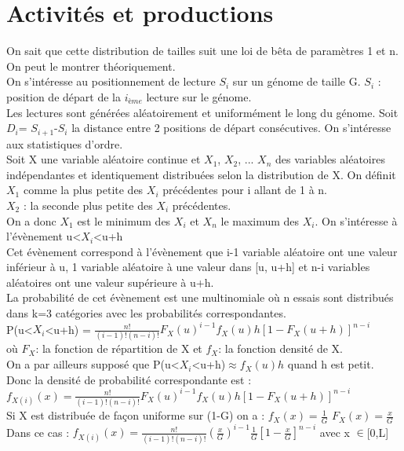 \documentclass[12pt,a4paper]{article} %
\begin{document}
\section{Activités et productions} 
On sait que cette distribution de tailles suit une loi de bêta de paramètres 1 et n.
On peut le montrer théoriquement. \\
On s'intéresse au positionnement de lecture $S_{i}$ sur un génome de taille G. $S_{i}$ : position de départ de la $i_{ème}$ lecture sur le génome.\\
Les lectures sont générées aléatoirement et uniformément le long du génome.
Soit $D_{i}$= $S_{i+1}$-$S_{i}$ la distance entre 2 positions de départ consécutives.
On s'intéresse aux statistiques d'ordre.\\
Soit X une variable aléatoire continue et $X_{1}$, $X_{2}$, ... $X_{n}$ des variables aléatoires indépendantes et identiquement distribuées selon la distribution de X.
On définit $X_{1}$ comme la plus petite des $X_{i}$ précédentes pour i allant de 1 à n.\\
$X_{2}$ : la seconde plus petite des $X_{i}$ précédentes.\\
On a donc $X_{1}$ est le minimum des $X_{i}$ et $X_{n}$ le maximum des $X_{i}$.
On s'intéresse à l'évènement u<$X_{i}$<u+h\\
Cet évènement correspond à l'évènement que i-1 variable aléatoire ont une valeur inférieur à u, 1 variable aléatoire à une valeur dans [u, u+h] et n-i variables aléatoires ont une valeur supérieure à u+h.\\
La probabilité de cet évènement est une multinomiale où n essais sont distribués dans k=3 catégories avec les probabilités correspondantes.\\
P(u<$X_{i}$<u+h) = $\frac{n!}{(i-1)!(n-i)!} F_X(u)^{i-1}f_X(u)h[1-F_X(u+h)]^{n-i}$\\
où $F_X $: la fonction de répartition de X
et $f_X $: la fonction densité de X.\\
On a par ailleurs supposé que P(u<$X_{i}$<u+h)$\approx f_X(u)h$ quand h est petit.
Donc la densité de probabilité correspondante est :\\
$f_{X(i)}(x) = \frac{n!}{(i-1)!(n-i)!} F_X(u)^{i-1}f_X(u)h[1-F_X(u+h)]^{n-i}$\\
Si X est distribuée de façon uniforme sur (1-G) on a :
$f_X(x)=\frac{1}{G}$  $F_X(x)=\frac{x}{G}$\\
Dans ce cas : 
$f_{X(i)}(x) = \frac{n!}{(i-1)!(n-i)!} (\frac{x}{G})^{i-1} \frac{1}{G} [1-\frac{x}{G}]^{n-i}$ avec x $ \in $[0,L]                                                                                                                                                                                                                                                                                                                                                                                                                                                                                                                                                                                                                                                       
\end{document}
